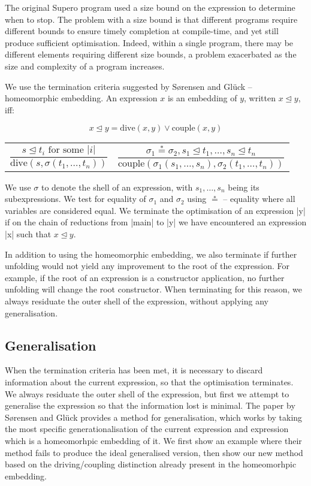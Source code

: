 \documentclass{llncs}
\begin{document}
The original Supero program used a size bound on the expression to determine when to stop. The problem with a size bound is that different programs require different bounds to ensure timely completion at compile-time, and yet still produce sufficient optimisation. Indeed, within a single program, there may be different elements requiring different size bounds, a problem exacerbated as the size and complexity of a program increases.

We use the termination criteria suggested by S{\o}rensen and Gl{\"u}ck \cite{sorensen:supercompilation} -- homeomorphic embedding. An expression $x$ is an embedding of $y$, written $x \unlhd y$, iff:

\[x \unlhd y = \text{dive}(x,y) \vee \text{couple}(x,y)\]
\vspace{-10mm}

\noindent\begin{tabular}{p{5cm}p{5cm}}
\[\frac{s \unlhd t_i \text{ for some } |i|}{\text{dive}(s, \sigma(t_1,\ldots,t_n))} \]
&
\[\frac{\sigma_1 \stackrel{*}{=} \sigma_2,
        s_1 \unlhd t_1, \ldots , s_n \unlhd t_n}
       {\text{couple}(\sigma_1 (s_1,\ldots,s_n), \sigma_2 (t_1,\ldots,t_n))}
\]
\end{tabular}

We use $\sigma$ to denote the shell of an expression, with $s_1,\ldots,s_n$ being its subexpressions. We test for equality of $\sigma_1$ and $\sigma_2$ using $\stackrel{*}{=}$ -- equality where all variables are considered equal. We terminate the optimisation of an expression |y| if on the chain of reductions from |main| to |y| we have encountered an expression |x| such that $x \unlhd y$.

In addition to using the homeomorphic embedding, we also terminate if further unfolding would not yield any improvement to the root of the expression. For example, if the root of an expression is a constructor application, no further unfolding will change the root constructor. When terminating for this reason, we always residuate the outer shell of the expression, without applying any generalisation.

\subsection{Generalisation}

When the termination criteria has been met, it is necessary to discard information about the current expression, so that the optimisation terminates. We always residuate the outer shell of the expression, but first we attempt to generalise the expression so that the information lost is minimal. The paper by S{\o}rensen and Gl{\"u}ck provides a method for generalisation, which works by taking the most specific generationalisation of the current expression and expression which is a homeomorhpic embedding of it. We first show an example where their method fails to produce the ideal generalised version, then show our new method based on the driving/coupling distinction already present in the homeomorhpic embedding.
\end{document}
